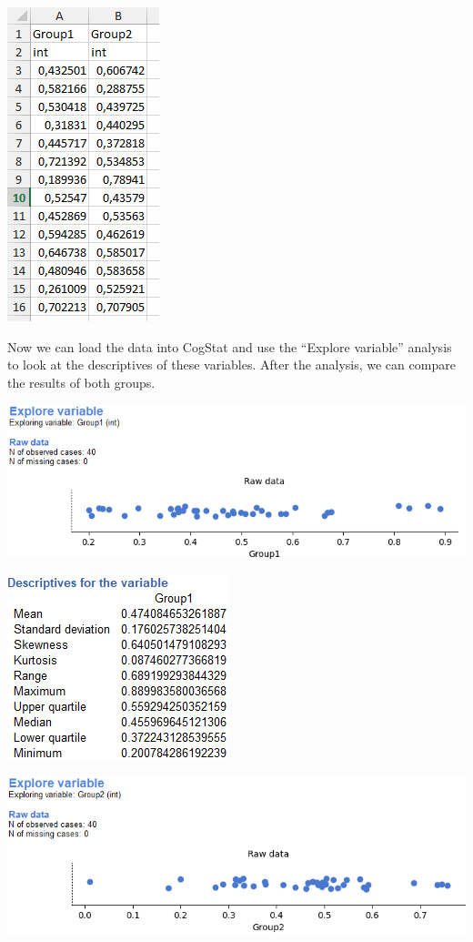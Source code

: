 \documentclass[
]{book}
\begin{document}
\includegraphics{img/ch5/5.3.4.1.5randGroup12.png}

Now we can load the data into CogStat and use the ``Explore variable'' analysis to look at the descriptives of these variables. After the analysis, we can compare the results of both groups.

\includegraphics{img/ch5/5.3.4.1.5randExpvarrawG1.png}

\includegraphics{img/ch5/5.3.4.1.5descrG1.png}

\includegraphics{img/ch5/5.3.4.1.5randExpvarrawG2.png}
\end{document}
